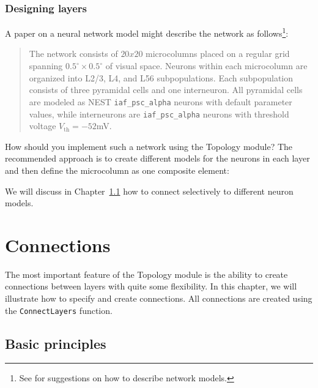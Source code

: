 \documentclass[a4paper,12pt]{report}
\begin{document}
\subsection{Designing layers}\label{sec:layerdesign}

A paper on a neural network model might describe the network as
follows\footnote{See \citet{Nord:2009(456)} for suggestions on how to
  describe network models.}:
\begin{quote}
The network consists of $20x20$ microcolumns placed on a regular grid
spanning $0.5^\circ\times 0.5^\circ$ of visual space. Neurons within each
microcolumn are organized into L2/3, L4, and L56
subpopulations. Each subpopulation consists of three pyramidal cells
and one interneuron. All pyramidal cells are modeled as NEST
\lstinline!iaf_psc_alpha! neurons with default parameter values, while
interneurons are \lstinline!iaf_psc_alpha! neurons with threshold voltage
$V_{\text{th}}=-52$mV.
\end{quote}
How should you implement such a network using the Topology module?
The recommended approach is to create different models for the
neurons in each layer and then define the microcolumn as one
composite element:
%

%
We will discuss in Chapter~\ref{sec:conn_basics} how to connect
selectively to different neuron models.


\chapter{Connections}\label{sec:connections}

The most important feature of the Topology module is the ability to
create connections between layers with quite some
flexibility. In this chapter, we will illustrate how to specify and
create connections. All connections are created using the
\lstinline!ConnectLayers! function.


\section{Basic principles}\label{sec:conn_basics}
\end{document}
